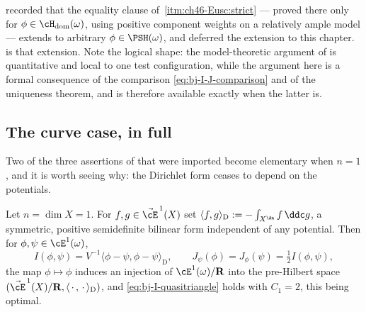 \begin{remark}
\label{rem:ch47-settles-ch46}
 recorded that the equality clause of
\,\cref{itm:ch46-Eusc:strict} --- proved there
only for $\phi\in\cH_{\mathrm{dom}}(\omega)$, using positive component
weights on a relatively ample model --- extends to arbitrary
$\phi\in\PSH(\omega)$, and deferred the extension to this chapter.
 is that extension.  Note the logical shape: the
model-theoretic argument of  is quantitative and
local to one test configuration, while the argument here is a formal
consequence of the comparison \eqref{eq:bj-I-J-comparison} and of the
uniqueness theorem, and is therefore available exactly when the latter is.
\end{remark}

\subsection{The curve case, in full}
\label{sec:ch47-curve-case}

Two of the three assertions of  that were
imported become elementary when $n=1$, and it is worth seeing why: the
Dirichlet form ceases to depend on the potentials.

\begin{proposition}
\label{prop:ch47-curve-I-norm}
Let $n=\dim X=1$.  For $f,g\in\vec\cE^{\,1}(X)$ set
$\langle f,g\rangle_{\mathrm D}:=-\int_{X^{\An}}f\,\ddc g$, a symmetric,
positive semidefinite bilinear form independent of any potential.  Then for
$\phi,\psi\in\cE^1(\omega)$,
\[
 I(\phi,\psi)=V^{-1}\langle\phi-\psi,\phi-\psi\rangle_{\mathrm D},
 \qquad
 J_\psi(\phi)=J_\phi(\psi)=\tfrac12 I(\phi,\psi),
\]
the map $\phi\mapsto\phi$ induces an injection of
$\cE^1(\omega)/\mathbf R$ into the pre-Hilbert space
$(\vec\cE^{\,1}(X)/\mathbf R,\langle\,\cdot\,,\,\cdot\,\rangle_{\mathrm D})$,
and \eqref{eq:bj-I-quasitriangle} holds with $C_1=2$, this being optimal.
\end{proposition}

